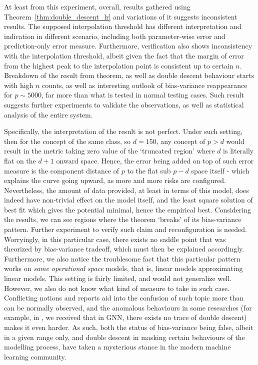 \documentclass[10pt]{article} %
\begin{document}
At least from this experiment, overall, results gathered using Theorem~\ref{thm:double_descent_lr} and variations of it suggests inconsistent results. The supposed interpolation threshold has different interpretation and indication in different scenario, including both parameter-wise error and prediction-only error measure. Furthermore, verification also shows inconsistency with the interpolation threshold, albeit given the fact that the margin of error from the highest peak to the interpolation point is consistent up to certain $n$. Breakdown of the result from theorem, as well as double descent behaviour starts with high $n$ counts, as well as interesting outlook of bias-variance reappearance for $p\sim 5000$, far more than what is tested in normal testing cases. Such result suggests further experiments to validate the observations, as well as statistical analysis of the entire system. 

Specifically, the interpretation of the result is not perfect. Under such setting, then for the concept of the same class, so $d=150$, any concept of $p>d$ would result in the metric taking zero value of the `truncated region' where $d$ is literally flat on the $d+1$ onward space. Hence, the error being added on top of such error measure is the component distance of $p$ to the flat sub $p-d$ space itself - which explains the curve going upward, as more and more risks are configured. Nevertheless, the amount of data provided, at least in terms of this model, does indeed have non-trivial effect on the model itself, and the least square solution of best fit which gives the potential minimal, hence the empirical best. Considering the results, we can see regions where the theorem `breaks' of its bias-variance pattern. Further experiment to verify such claim and reconfiguration is needed. Worryingly, in this particular case, there exists no saddle point that was theorized by bias-variance tradeoff, which must then be explained accordingly. Furthermore, we also notice the troublesome fact that this particular pattern works on \textit{same operational space} models, that is, linear models approximating linear models. This setting is fairly limited, and would not generalize well. However, we also do not know what kind of measure to take in such case. Conflicting notions and reports aid into the confusion of such topic more than can be normally observed, and the anomalous behaviours in some researches (for example, in \cite{shi2024homophilymodulatesdoubledescent}, we received that in GNN, there exists no trace of double descent) makes it even harder. As such, both the status of bias-variance being false, albeit in a given range only, and double descent in masking certain behaviours of the modelling process, have taken a mysterious stance in the modern machine learning community.
\end{document}
